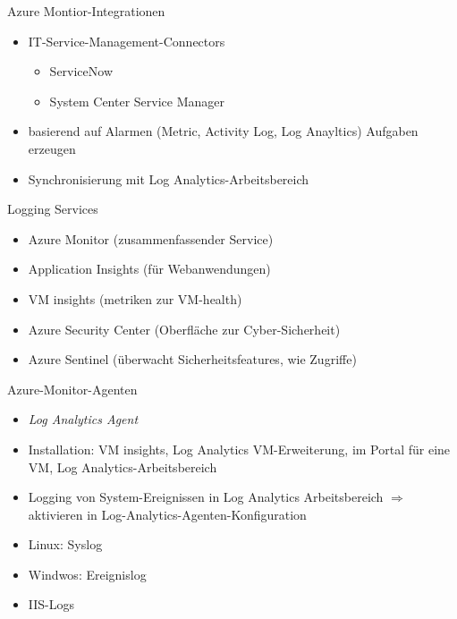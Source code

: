\begin{flashcard}[Definition]{Azure Montior-Integrationen}
  \begin{itemize}
    \item IT-Service-Management-Connectors
      \begin{itemize}
        \item ServiceNow
        \item System Center Service Manager
      \end{itemize}
    \item basierend auf Alarmen (Metric, Activity Log, Log Anayltics) Aufgaben erzeugen
    \item Synchronisierung mit Log Analytics-Arbeitsbereich
  \end{itemize}
\end{flashcard}


\begin{flashcard}[Definition]{Logging Services}
  \begin{itemize}
    \item Azure Monitor (zusammenfassender Service)
    \item Application Insights (für Webanwendungen)
    \item VM insights (metriken zur VM-health)
    \item Azure Security Center (Oberfläche zur Cyber-Sicherheit)
    \item Azure Sentinel (überwacht Sicherheitsfeatures, wie Zugriffe)
  \end{itemize}
\end{flashcard}

\begin{flashcard}[Definition]{Azure-Monitor-Agenten}
  \begin{itemize}
    \item \emph{Log Analytics Agent}
    \item Installation: VM insights, Log Analytics VM-Erweiterung, im Portal für eine VM, Log Analytics-Arbeitsbereich
    \item Logging von System-Ereignissen in Log Analytics Arbeitsbereich\newline
      $\Rightarrow$ aktivieren in Log-Analytics-Agenten-Konfiguration
    \item Linux: Syslog
    \item Windwos: Ereignislog
    \item IIS-Logs
  \end{itemize}
\end{flashcard}


